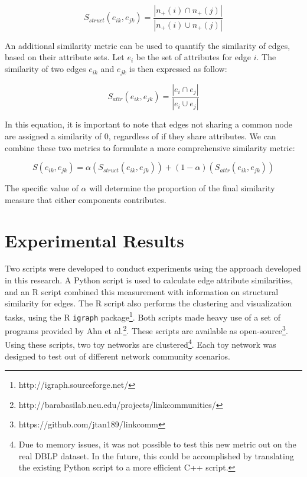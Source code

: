 \documentclass{report} %
\begin{document}
\begin{equation}
  S_{struct}(e_{ik},e_{jk}) = \frac{|n_+(i) \cap n_+(j)|}{|n_+(i) \cup n_+(j)|}
\end{equation}

An additional similarity metric can be used to quantify the similarity of edges, based on their attribute sets. Let $e_i$ be the set of attributes for edge $i$. The similarity of two edges $e_{ik}$ and $e_{jk}$ is then expressed as follow:

\begin{equation}
  S_{attr}(e_{ik},e_{jk}) = \frac{|e_i \cap e_j|}{|e_i \cup e_j|}
\end{equation}

In this equation, it is important to note that edges not sharing a common node are assigned a similarity of 0, regardless of if they share attributes. We can combine these two metrics to formulate a more comprehensive similarity metric:

\begin{equation}
  S(e_{ik},e_{jk}) = \alpha (S_{struct}(e_{ik},e_{jk})) + (1-\alpha)(S_{attr}(e_{ik},e_{jk}))
\end{equation}

The specific value of $\alpha$ will determine the proportion of the final similarity measure that either components contributes.

\section*{Experimental Results}

Two scripts were developed to conduct experiments using the approach developed in this research. A Python script is used to calculate edge attribute similarities, and an R script combined this measurement with information on structural similarity for edges. The R script also performs the clustering and visualization tasks, using the R \texttt{igraph} package\footnote{http://igraph.sourceforge.net/}. Both scripts made heavy use of a set of programs provided by Ahn et al.\footnote{http://barabasilab.neu.edu/projects/linkcommunities/}. These scripts are available as open-source\footnote{https://github.com/jtan189/linkcomm}.\\

Using these scripts, two toy networks are clustered\footnote{Due to memory issues, it was not possible to test this new metric out on the real DBLP dataset. In the future, this could be accomplished by translating the existing Python script to a more efficient C++ script.}. Each toy network was designed to test out of different network community scenarios.
\end{document}
